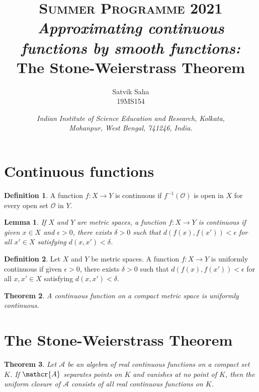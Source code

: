 \documentclass[11pt]{article}
\title{
    \Large\textsc{Summer Programme 2021} \\
    \vspace{10pt}
    \textit{\Large Approximating continuous functions by smooth functions:} \\
    \huge The Stone-Weierstrass Theorem
}
\author{
    \large Satvik Saha%
    \\\textsc{\small 19MS154}
}
\date{\normalsize
    \textit{Indian Institute of Science Education and Research, Kolkata, \\
    Mohanpur, West Bengal, 741246, India.} \\
}
\newtheorem{theorem}{Theorem}[section]
\newtheorem{lemma}[theorem]{Lemma}
\theoremstyle{definition}
\newtheorem{definition}{Definition}[section]
\theoremstyle{remark}
\begin{document}
    \maketitle

    \section{Continuous functions}
    \begin{definition}
        A function $f\colon X \to Y$ is continuous if $f^{-1}(\mathscr{O})$ is open
        in $X$ for every open set $\mathscr{O}$ in $Y$.
    \end{definition}

    \begin{lemma}
        If $X$ and $Y$ are metric spaces, a function $f\colon X \to Y$ is continuous
        if given $x \in X$ and $\epsilon > 0$, there exists $\delta > 0$ such that
        $d(f(x), f(x')) < \epsilon$ for all $x' \in X$ satisfying $d(x, x') <
        \delta$.
    \end{lemma}

    \begin{definition}
        Let $X$ and $Y$ be metric spaces.  A function $f\colon X \to Y$ is uniformly
        continuous if given $\epsilon > 0$, there exists $\delta > 0$ such that
        $d(f(x), f(x')) < \epsilon$ for all $x, x' \in X$ satisfying $d(x, x') <
        \delta$.
    \end{definition}

    \begin{theorem}
        A continuous function on a compact metric space is uniformly continuous.
    \end{theorem}

    \section{The Stone-Weierstrass Theorem}
    \begin{theorem}
        Let $\mathscr{A}$ be an algebra of real continuous functions on a compact
        set $K$. If $\mathcr{A}$ separates points on $K$ and vanishes at no point of
        $K$, then the uniform closure of $\mathscr{A}$ consists of all real
        continuous functions on $K$.
    \end{theorem}
\end{document}
